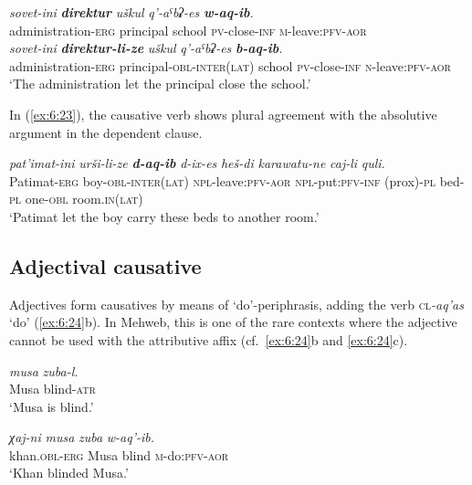 ﻿\documentclass[output=paper]{langsci/langscibook}
\begin{document}
\ea \label{ex:6:22} %
\ea %
\gll \emph{sovet-ini} \emph{\textbf{direktur}} \emph{uškul} \emph{q'-aˤbʡ-es} \emph{\textbf{w-aq-ib}.}\\
administration-\textsc{erg} principal school \textsc{pv}-close-\textsc{inf} \textsc{m}-leave:\textsc{pfv}-\textsc{aor}\\

\ex %
\gll \emph{sovet-ini} \emph{\textbf{direktur-li-ze}} \emph{uškul} \emph{q'-aˤbʡ-es} \emph{\textbf{b-aq-ib}.}\\
administration-\textsc{erg} principal-\textsc{obl}-\textsc{inter}(\textsc{lat}) school \textsc{pv}-close-\textsc{inf} \textsc{n}-leave:\textsc{pfv}-\textsc{aor}\\
\glt `The administration let the principal close the school.'
\z
\z

In (\ref{ex:6:23}), the causative verb shows plural agreement with the absolutive
argument in the dependent clause.

\ea \label{ex:6:23} %
\gll \emph{pat'imat-ini} \emph{urši-li-ze} \emph{\textbf{d-aq-ib}} \emph{d-ix-es} \emph{heš-di} \emph{karawatu-ne} \emph{caj-li} \emph{quli.}\\
Patimat-\textsc{erg} boy-\textsc{obl}-\textsc{inter(lat)} \textsc{npl}-leave:\textsc{pfv}-\textsc{aor} \textsc{npl}-put:\textsc{pfv}-\textsc{inf} \textsc(prox)-\textsc{pl} bed-\textsc{pl} one-\textsc{obl} room.\textsc{in}(\textsc{lat})\\
\glt `Patimat let the boy carry these beds to another room.'
\z


\subsection{Adjectival causative}\label{Adjectival-causative}

Adjectives form causatives by means of `do'-periphrasis, adding the verb
\textsc{cl}\emph{-aq'as} `do' (\ref{ex:6:24}b). In Mehweb, this is one of the rare
contexts where the adjective cannot be used with the attributive affix
(cf.\ \ref{ex:6:24}b and \ref{ex:6:24}c).

\ea \label{ex:6:24} %
\ea %
\gll \emph{musa} \emph{zuba-l.}\\
Musa blind-\textsc{atr}\\
\glt `Musa is blind.'

\ex %
\gll \emph{χaj-ni} \emph{musa} \emph{zuba} \emph{w-aq'-ib.}\\
khan.\textsc{obl}-\textsc{erg} Musa blind \textsc{m}-do:\textsc{pfv}-\textsc{aor}\\
\glt `Khan blinded Musa.'   
\end{document}
